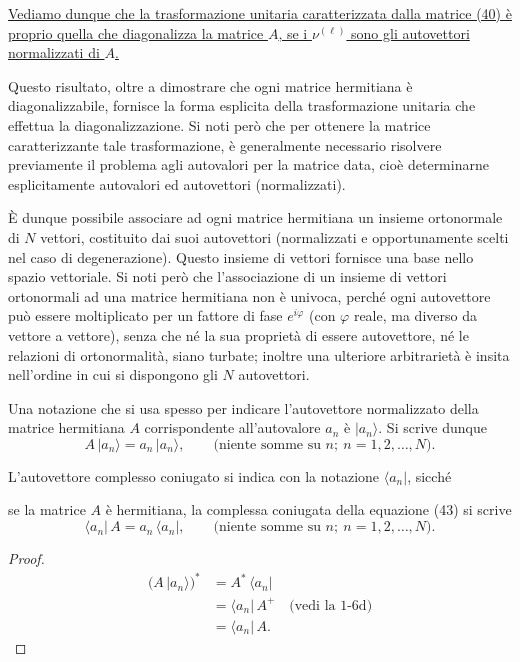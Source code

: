 \documentclass[11pt, a4paper]{book}
\numberwithin{equation}{section}
\begin{document}
\uline{Vediamo dunque che la trasformazione unitaria caratterizzata dalla
matrice (40) è proprio quella che diagonalizza la matrice $A$, se i
$\nu^{(\ell)}$ sono gli autovettori normalizzati di $A$.}

Questo risultato, oltre a dimostrare che ogni matrice hermitiana è
diagonalizzabile, fornisce la forma esplicita della trasformazione unitaria
che effettua la diagonalizzazione. Si noti però che per ottenere la matrice
caratterizzante tale trasformazione, è generalmente necessario risolvere
previamente il problema agli autovalori per la matrice data, cioè
determinarne esplicitamente autovalori ed autovettori (normalizzati).

È dunque possibile associare ad ogni matrice hermitiana un insieme
ortonormale di $N$ vettori, costituito dai suoi autovettori (normalizzati e
opportunamente scelti nel caso di degenerazione). Questo insieme di vettori
fornisce una base nello spazio vettoriale. Si noti però che l'associazione
di un insieme di vettori ortonormali ad una matrice hermitiana non è
univoca, perché ogni autovettore può essere moltiplicato per un fattore di
fase $e^{i\varphi}$ (con $\varphi$ reale, ma diverso da vettore a vettore),
senza che né la sua proprietà di essere autovettore, né le relazioni di
ortonormalità, siano turbate; inoltre una ulteriore arbitrarietà è insita
nell'ordine in cui si dispongono gli $N$ autovettori.

Una notazione che si usa spesso per indicare l'autovettore normalizzato
della matrice hermitiana $A$ corrispondente all'autovalore $a_n$ è
$|a_n\rangle$. Si scrive dunque
\begin{equation}
A\,|a_n\rangle = a_n\,|a_n\rangle,
\qquad \text{(niente somme su }n;\ n=1,2,\ldots,N\text{)}.
\end{equation}

L'autovettore complesso coniugato si indica con la notazione $\langle
a_n|$, sicché


se la matrice $A$ è hermitiana, la complessa coniugata della equazione
(43) si scrive
\begin{equation}
\langle a_n|\,A = a_n\,\langle a_n|,
\qquad \text{(niente somme su }n;\ n=1,2,\ldots,N\text{)}.
\end{equation}

\begin{proof}
\begin{align*}
\bigl(A\,|a_n\rangle\bigr)^* &= A^*\,\langle a_n| \\
  &= \langle a_n|\,A^+  \quad \text{(vedi la 1-6d)} \\
  &= \langle a_n|\,A.
\end{align*}
\end{proof}
\end{document}
